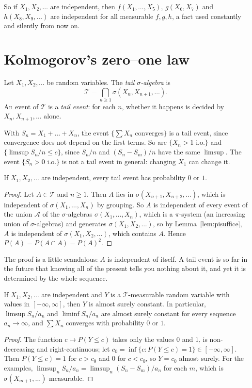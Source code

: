 So if $X_1,X_2,\dots$ are independent, then $f(X_1,\dots,X_5)$, $g(X_6,X_7)$ and $h(X_8,X_9,\dots)$ are independent for all
measurable $f,g,h$, a fact used constantly and silently from now on.

\section{Kolmogorov's zero--one law}

\begin{definition}
Let $X_1,X_2,\dots$ be random variables. The \emph{tail $\sigma$-algebra} is
\[
\mathcal T=\bigcap_{n\ge1}\sigma(X_n,X_{n+1},\dots).
\]
An event of $\mathcal T$ is a \emph{tail event}: for each $n$, whether it happens is decided by $X_n,X_{n+1},\dots$ alone.
\end{definition}

With $S_n=X_1+\dots+X_n$, the event $\{\sum X_n\text{ converges}\}$ is a tail event, since convergence does not depend on
the first terms. So are $\{X_n>1\text{ i.o.}\}$ and $\{\limsup S_n/n\le c\}$, since $S_n/n$ and $(S_n-S_m)/n$ have the same
$\limsup$. The event $\{S_n>0\text{ i.o.}\}$ is not a tail event in general: changing $X_1$ can change it.

\begin{theorem}\label{thm:kolmogorov01}
If $X_1,X_2,\dots$ are independent, every tail event has probability $0$ or $1$.
\end{theorem}
\begin{proof}
Let $A\in\mathcal T$ and $n\ge1$. Then $A$ lies in $\sigma(X_{n+1},X_{n+2},\dots)$, which is independent of $\sigma(X_1,\dots,X_n)$ by
grouping. So $A$ is independent of every event of the union $\mathcal A$ of the $\sigma$-algebras $\sigma(X_1,\dots,X_n)$, which is a
$\pi$-system (an increasing union of $\sigma$-algebras) and generates $\sigma(X_1,X_2,\dots)$, so by Lemma~\ref{lem:pisuffice},
$A$ is independent of $\sigma(X_1,X_2,\dots)$, which contains $A$. Hence $P(A)=P(A\cap A)=P(A)^2$.
\end{proof}

The proof is a little scandalous: $A$ is independent of itself. A tail event is so far in the future that knowing all
of the present tells you nothing about it, and yet it is determined by the whole sequence.

\begin{corollary}\label{cor:tailconst}
If $X_1,X_2,\dots$ are independent and $Y$ is a $\mathcal T$-measurable random variable with values in $[-\infty,\infty]$,
then $Y$ is almost surely constant. In particular, $\limsup S_n/a_n$ and $\liminf S_n/a_n$ are almost surely constant for
every sequence $a_n\to\infty$, and $\sum X_n$ converges with probability $0$ or $1$.
\end{corollary}
\begin{proof}
The function $c\mapsto P(Y\le c)$ takes only the values $0$ and $1$, is non-decreasing and right-continuous; let
$c_0=\inf\{c:P(Y\le c)=1\}\in[-\infty,\infty]$. Then $P(Y\le c)=1$ for $c>c_0$ and $0$ for $c<c_0$, so $Y=c_0$ almost surely.
For the examples, $\limsup_n S_n/a_n=\limsup_n(S_n-S_m)/a_n$ for each $m$, which is $\sigma(X_{m+1},\dots)$-measurable.
\end{proof}

